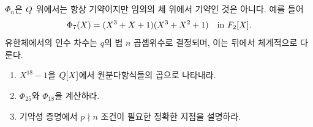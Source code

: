 \begin{pitfall}
$\Phi_n$은 $Q$ 위에서는 항상 기약이지만 임의의 체 위에서 기약인 것은 아니다. 예를 들어
\[
  \Phi_7(X)
  =(X^3+X+1)(X^3+X^2+1)
  \quad\text{in }F_2[X].
\]
유한체에서의 인수 차수는 $q$의 법 $n$ 곱셈위수로 결정되며, 이는 뒤에서 체계적으로 다룬다.
\end{pitfall}

\begin{checkpoint}
\begin{enumerate}[label=(\alph*)]
  \item $X^{18}-1$을 $Q[X]$에서 원분다항식들의 곱으로 나타내라.
  \item $\Phi_{25}$와 $\Phi_{18}$을 계산하라.
  \item 기약성 증명에서 $p\nmid n$ 조건이 필요한 정확한 지점을 설명하라.
\end{enumerate}
\end{checkpoint}
